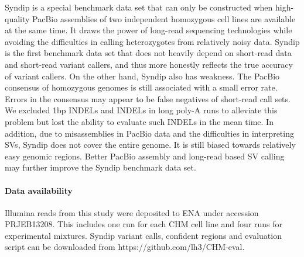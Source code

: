 \documentclass{bioinfo}
\begin{document}
Syndip is a special benchmark data set that can only be constructed when
high-quality PacBio assemblies of two independent homozygous cell lines are
available at the same time. It draws the power of long-read sequencing
technologies while avoiding the difficulties in calling heterozygotes from
relatively noisy data. Syndip is the first benchmark data set that does not
heavily depend on short-read data and short-read variant callers, and thus more
honestly reflects the true accuracy of variant callers. On the other hand,
Syndip also has weakness. The PacBio consensus of homozygous genomes
is still associated with a small error rate. Errors in the consensus may appear
to be false negatives of short-read call sets. We excluded 1bp INDELs and
INDELs in long poly-A runs to alleviate this problem but lost the ability to
evaluate such INDELs in the mean time. In addition, due to misassemblies in
PacBio data and the difficulties in interpreting SVs, Syndip does not cover
the entire genome. It is still biased towards relatively easy genomic
regions. Better PacBio assembly and long-read based SV calling may further
improve the Syndip benchmark data set.

\paragraph{Data availability\textcolon} Illumina reads from this study were
deposited to ENA under accession PRJEB13208. This includes one run for each CHM
cell line and four runs for experimental mixtures. Syndip
variant calls, confident regions and evaluation script can be downloaded from
https://github.com/lh3/CHM-eval.

%


\end{document}
